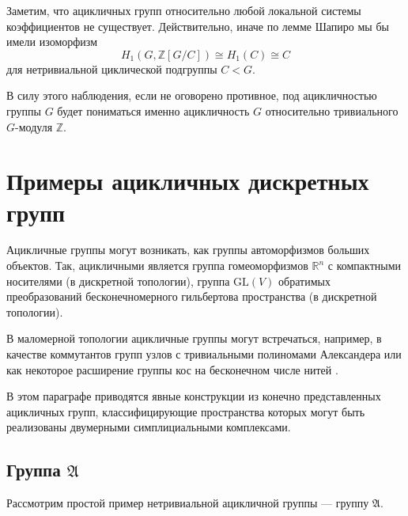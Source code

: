 \documentclass[14pt, dvipsnames, twoside]{extarticle}
\theoremstyle{definition}
\theoremstyle{remark}
\begin{document}
 
 Заметим, что ацикличных групп относительно любой локальной системы коэффициентов не существует. Действительно, иначе по лемме Шапиро \cite{Brown} мы бы имели изоморфизм $$H_1(G, \mathbb{Z}[G/C]) \cong H_1(C) \cong C $$ для нетривиальной циклической подгруппы $C < G$. 
 
 В силу этого наблюдения, если не оговорено противное, под ацикличностью группы $G$ будет пониматься именно ацикличность $G$ относительно тривиального $G$-модуля $\mathbb{Z}$.
 




























\section{Примеры ацикличных дискретных групп}

Ацикличные группы могут возникать, как группы автоморфизмов больших объектов. Так, ацикличными является группа гомеоморфизмов $\mathbb{R}^n$ с компактными носителями \cite{Mather} (в дискретной топологии), группа $\mathrm{GL}(V)$ обратимых преобразований бесконечномерного гильбертова пространства \cite{Automorphisms} (в дискретной топологии).

В маломерной топологии ацикличные группы могут встречаться, например, в качестве коммутантов групп узлов с тривиальными полиномами Александера \cite{View} или как некоторое расширение группы кос на бесконечном числе нитей \cite{BerrickHillman}.

В этом параграфе приводятся явные конструкции из \cite{BDH} конечно представленных ацикличных групп, классифицирующие пространства которых могут быть реализованы двумерными симплициальными комплексами. 

\subsection{Группа $\mathfrak{A}$} 


Рассмотрим простой пример нетривиальной ацикличной группы --- группу $\mathfrak{A}$.
\end{document}
